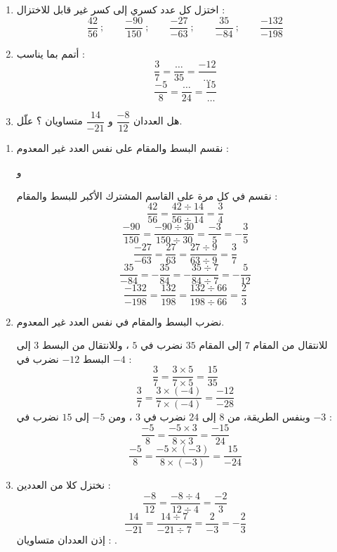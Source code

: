 \documentclass[12pt,a4paper]{article}
\begin{document}
\begin{corr}[title={الاختزال وتساوي الأعداد الكسرية}, stars=1, source={Axiomaths}]
\begin{enumerate}
  \item اختزل كل عدد كسري إلى كسر غير قابل للاختزال :
  \[\dfrac{42}{56}\ ;\qquad \dfrac{-90}{150}\ ;\qquad \dfrac{-27}{-63}\ ;\qquad \dfrac{35}{-84}\ ;\qquad \dfrac{-132}{-198}\]
  \item أتمم بما يناسب :
  \[\dfrac{3}{7}=\dfrac{\ldots}{35}=\dfrac{-12}{\ldots}\]
  \[\dfrac{-5}{8}=\dfrac{\ldots}{24}=\dfrac{15}{\ldots}\]
  \item هل العددان $\dfrac{-8}{12}$ و $\dfrac{14}{-21}$ متساويان ؟ علّل.
\end{enumerate}
\axsol
\begin{enumerate}[itemsep=14pt]
  \item\leavevmode
  \begin{prop}
  نقسم البسط والمقام على نفس العدد غير المعدوم : 
  \end{prop}
  \begin{prop}
   \qquad و \qquad {}
  \end{prop}
  نقسم في كل مرة على القاسم المشترك الأكبر للبسط والمقام :
  \[\dfrac{42}{56}=\dfrac{42\div14}{56\div14}=\dfrac{3}{4}\]
  \[\dfrac{-90}{150}=\dfrac{-90\div30}{150\div30}=\dfrac{-3}{5}=-\dfrac{3}{5}\]
  \[\dfrac{-27}{-63}=\dfrac{27}{63}=\dfrac{27\div9}{63\div9}=\dfrac{3}{7}\]
  \[\dfrac{35}{-84}=-\dfrac{35}{84}=-\dfrac{35\div7}{84\div7}=-\dfrac{5}{12}\]
  \[\dfrac{-132}{-198}=\dfrac{132}{198}=\dfrac{132\div66}{198\div66}=\dfrac{2}{3}\]
  \item نضرب البسط والمقام في نفس العدد غير المعدوم.

  للانتقال من المقام $7$ إلى المقام $35$ نضرب في $5$ ، وللانتقال من البسط $3$ إلى البسط $-12$ نضرب في $-4$ :
  \[\dfrac{3}{7}=\dfrac{3\times5}{7\times5}=\dfrac{15}{35}\]
  \[\dfrac{3}{7}=\dfrac{3\times(-4)}{7\times(-4)}=\dfrac{-12}{-28}\]
  وبنفس الطريقة، من $8$ إلى $24$ نضرب في $3$ ، ومن $-5$ إلى $15$ نضرب في $-3$ :
  \[\dfrac{-5}{8}=\dfrac{-5\times3}{8\times3}=\dfrac{-15}{24}\]
  \[\dfrac{-5}{8}=\dfrac{-5\times(-3)}{8\times(-3)}=\dfrac{15}{-24}\]
  \item نختزل كلا من العددين :
  \[\dfrac{-8}{12}=\dfrac{-8\div4}{12\div4}=\dfrac{-2}{3}\]
  \[\dfrac{14}{-21}=\dfrac{14\div7}{-21\div7}=\dfrac{2}{-3}=-\dfrac{2}{3}\]
  إذن العددان متساويان : .
\end{enumerate}
\end{corr}
\end{document}
